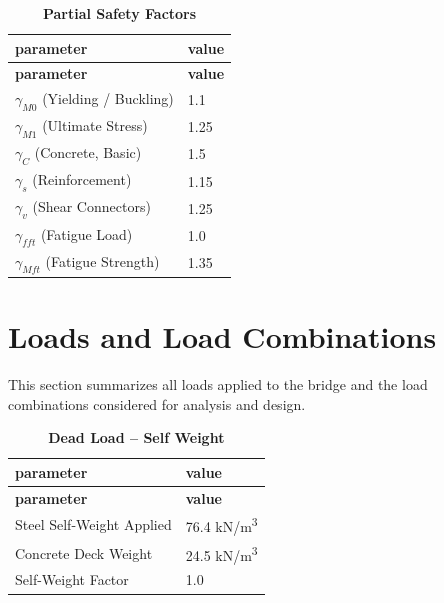 \documentclass[12pt,a4paper]{report}
\numberwithin{table}{chapter}
\numberwithin{figure}{chapter}
\begin{document}
\vspace{0.4em}
\begin{longtable}{|L{5.5cm}|p{10.0cm}|}
\caption{\textbf{Partial Safety Factors}}\\
\hline
\textbf{parameter} & \textbf{value} \\
\hline
\endfirsthead

\hline
\textbf{parameter} & \textbf{value} \\
\hline
\endhead
\hline
\endlastfoot
\textnormal{$\gamma_{M0}$ (Yielding / Buckling)} & 1.1 \\[6pt]
\hline
\textnormal{$\gamma_{M1}$ (Ultimate Stress)} & 1.25 \\[6pt]
\hline
\textnormal{$\gamma_C$ (Concrete, Basic)} & 1.5 \\[6pt]
\hline
\textnormal{$\gamma_s$ (Reinforcement)} & 1.15 \\[6pt]
\hline
\textnormal{$\gamma_v$ (Shear Connectors)} & 1.25 \\[6pt]
\hline
\textnormal{$\gamma_{fft}$ (Fatigue Load)} & 1.0 \\[6pt]
\hline
\textnormal{$\gamma_{Mft}$ (Fatigue Strength)} & 1.35 \\[6pt]
\end{longtable}


\chapter{Loads and Load Combinations}

This section summarizes all loads applied to the bridge and the load combinations considered for analysis and design.

\vspace{1em}
\begin{longtable}{|L{5.5cm}|p{10.0cm}|}
\caption{\textbf{Dead Load -- Self Weight}}\\
\hline
\textbf{parameter} & \textbf{value} \\
\hline
\endfirsthead

\hline
\textbf{parameter} & \textbf{value} \\
\hline
\endhead
\hline
\endlastfoot
\textnormal{Steel Self-Weight Applied} & 76.4 kN/m\textsuperscript{3} \\[6pt]
\hline
\textnormal{Concrete Deck Weight} & 24.5 kN/m\textsuperscript{3} \\[6pt]
\hline
\textnormal{Self-Weight Factor} & 1.0 \\[6pt]
\end{longtable}
\end{document}
